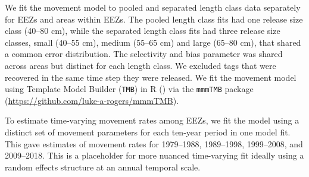 \documentclass{article}
\newcommand{\lr}[1]{{\color{blue}#1}}
\begin{document}
We fit the movement model to pooled and separated length class data separately for EEZs and areas within EEZs. The pooled length class fits had one release size class (40--80 cm), while the separated length class fits had three release size classes, small (40--55 cm), medium (55--65 cm) and large (65--80 cm), that shared a common error distribution. The selectivity and bias parameter was shared across areas but distinct for each length class. We excluded tags that were recovered in the same time step they were released. We fit the movement model using Template Model Builder (\texttt{TMB}) \cite[][]{kristensen2016} in R (\citeyear{r2020}) via the \texttt{mmmTMB} package (\url{https://github.com/luke-a-rogers/mmmTMB}).


To estimate time-varying movement rates among EEZs, we fit the model using a distinct set of movement parameters for each ten-year period in one model fit. This gave estimates of movement rates for 1979--1988, 1989--1998, 1999--2008, and 2009--2018. \lr{This is a placeholder for more nuanced time-varying fit ideally using a random effects structure at an annual temporal scale}.
\end{document}
